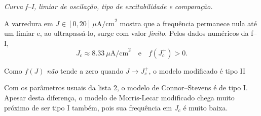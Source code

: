 \documentclass[english,11pt,a4paper]{article}
\begin{document}
	
	\noindent\textit{Curva f–I, limiar de oscilação, tipo de excitabilidade e comparação.}
	
	\medskip
	\noindent	A varredura em $J\in[0,20]\,\mu\mathrm{A/cm}^2$ mostra que a frequência permanece nula
	até um limiar e, ao ultrapassá-lo, surge com valor \emph{finito}.
	Pelos dados numéricos da f–I,
	\[
	J_c \approx 8.33\ \mu\mathrm{A/cm}^2
	\quad\text{e}\quad
	f(J_c^+)>0 .
	\]
	
	\medskip
	\noindent Como $f(J)$ \emph{não} tende a zero quando $J\to J_c^+$,
	o modelo modificado é tipo II
	
	\medskip
	\noindent Com os parâmetros usuais da lista 2, o modelo de Connor–Stevens é de tipo I. Apesar desta diferença, o modelo de Morris-Lecar modificado chega muito próximo de ser tipo I também, pois sua frequência em $J_c$ é muito baixa.
		
	
	
	
	
	
\end{document}
